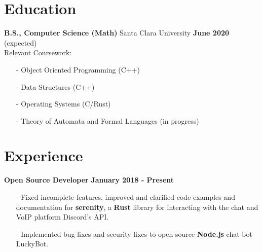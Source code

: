 \documentclass[margin,line]{res}
\begin{document}
\newcommand{\myname}{Derrick Lee}
\newlength{\mynamewidth}
\settowidth{\mynamewidth}{\namefont\myname}

\name{\hspace*{0.5\textwidth}\hspace{-0.5\mynamewidth} \myname \vspace*{.1in}}
\thispagestyle{empty}

\begin{resume}




\section{\sc Education}
{\bf B.S., Computer Science (Math)} Santa Clara University \hfill {\bf June 2020} (expected)\\
Relevant Coursework:
\begin{itemize} \itemsep -2pt
  \item[-] Object Oriented Programming (C++)
  \item[-] Data Structures (C++)
  \item[-] Operating Systems (C/Rust)
  \item[-] Theory of Automata and Formal Languages (in progress)
\end{itemize}

\section{\sc Experience}
  {\bf Open Source Developer} \hfill {\bf January 2018 - Present} \\
  \vspace{-3.5mm}
  \begin{itemize} \itemsep -2pt
    \item[-] Fixed incomplete features, improved and clarified code examples and documentation for
    {\bf serenity}, a {\bf Rust} library for interacting with the chat and VoIP platform Discord's API. 
    \item[-] Implemented bug fixes and security fixes to open source {\bf Node.js} chat bot LuckyBot.
  \end{itemize}


\end{resume}
\end{document}
